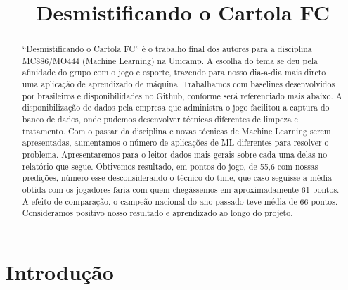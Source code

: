 \documentclass[conference]{IEEEtran}
\begin{document}
\title{Desmistificando o Cartola FC}

\author
{
  \and
  \and
  \and
}

\maketitle

\begin{abstract}

“Desmistificando o  Cartola FC”  é o  trabalho final  dos autores
para a disciplina MC886/MO444 (Machine Learning) na Unicamp. A escolha
do tema se deu pela afinidade do  grupo com o jogo e esporte, trazendo
para nosso  dia-a-dia mais  direto uma  aplicação de  aprendizado de
máquina. Trabalhamos  com baselines  desenvolvidos por  brasileiros e
disponibilidades no Github, conforme será referenciado mais abaixo. A
disponibilização  de  dados  pela  empresa  que  administra  o  jogo
facilitou  a  captura do  banco  de  dados, onde  pudemos  desenvolver
técnicas  diferentes  de  limpeza  e  tratamento.  Com  o  passar  da
disciplina e  novas técnicas de Machine  Learning serem apresentadas,
aumentamos o número de aplicações  de ML diferentes para resolver o
problema. Apresentaremos  para o leitor  dados mais gerais  sobre cada
uma delas no  relatório que segue. Obtivemos resultado,  em pontos do
jogo, de 55,6  com nossas predições, número  esse desconsiderando o
técnico do time,  que caso seguisse a média obtida  com os jogadores
faria com quem chegássemos em  aproximadamente 61 pontos. A efeito de
comparação, o  campeão nacional  do ano passado  teve média  de 66
pontos. Consideramos  positivo nosso resultado e  aprendizado ao longo
do projeto.

\end{abstract}

\section{Introdução}
\end{document}
